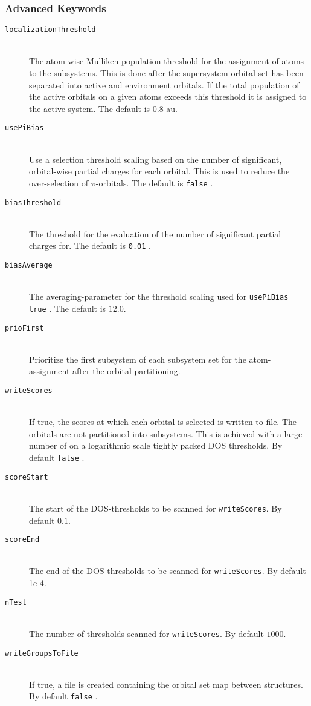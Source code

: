 \documentclass[bibliography=totocnumbered,a4paper,10pt,oneside]{scrbook}
\newcommand{\ttt}[1]{%
  \begingroup\setlength{\fboxsep}{1pt}%
  \colorbox{serenity-green!30}{\texttt{\hspace*{2pt}\vphantom{(g}#1\hspace*{2pt}}}%
  \endgroup
}
\begin{document}
\subsubsection{Advanced Keywords}
\begin{description}
    \item [\texttt{localizationThreshold}]\hfill \\
    The atom-wise Mulliken population threshold for the assignment of atoms to the subsystems. This is done
    after the supersystem orbital set has been separated into active and environment orbitals. If the total
    population of the active orbitals on a given atoms exceeds this threshold it is assigned to the active
    system. The default is $0.8$ au.
    \item [\texttt{usePiBias}]\hfill \\
    Use a selection threshold scaling based on the number of significant, orbital-wise partial charges for
    each orbital. This is used to reduce the over-selection of $\pi$-orbitals. The default is \ttt{false}.
    \item [\texttt{biasThreshold}]\hfill \\
    The threshold for the evaluation of the number of significant partial charges for. The default is
    \ttt{0.01}.
    \item [\texttt{biasAverage}]\hfill \\
    The averaging-parameter for the threshold scaling used for \ttt{usePiBias true}.
    The default is $12.0$.
    \item [\texttt{prioFirst}]\hfill \\
    Prioritize the first subsystem of each subsystem set for the atom-assignment after
    the orbital partitioning.
    \item [\texttt{writeScores}]\hfill \\
    If true, the scores at which each orbital is selected is written to file.
    The orbitals are not partitioned into subsystems.
    This is achieved with a large number of on a logarithmic scale tightly packed DOS thresholds.
    By default \ttt{false}.
    \item [\texttt{scoreStart}]\hfill \\
    The start of the DOS-thresholds to be scanned for \texttt{writeScores}.
    By default $0.1$.
    \item [\texttt{scoreEnd}]\hfill \\
    The end of the DOS-thresholds to be scanned for \texttt{writeScores}.
    By default 1e-4.
    \item [\texttt{nTest}]\hfill \\
    The number of thresholds scanned for \texttt{writeScores}. By default $1000$.
    \item [\texttt{writeGroupsToFile}]\hfill \\
    If true, a file is created containing the orbital set map between structures. By default \ttt{false}.
 \end{description}
\end{document}

